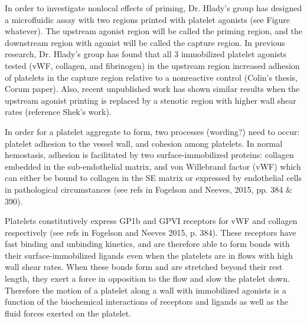 In order to investigate nonlocal effects of priming, Dr. Hlady's group
has designed a microfluidic assay with two regions printed with
platelet agonists (see Figure whatever). The upstream agonist region
will be called the priming region, and the downstream region with
agonist will be called the capture region. In previous research,
Dr. Hlady's group has found that all 3 immobilized platelet agonists
tested (vWF, collagen, and fibrinogen) in the upstream region
increased adhesion of platelets in the capture region relative to a
nonreactive control (Colin's thesis, Corum paper). Also, recent
unpublished work has shown similar results when the upstream agonist
printing is replaced by a stenotic region with higher wall shear rates
(reference Shek's work).
	
In order for a platelet aggregate to form, two processes (wording?)
need to occur: platelet adhesion to the vessel wall, and cohesion
among platelets. In normal hemostasis, adhesion is facilitated by two
surface-immobilized proteins: collagen embedded in the sub-endothelial
matrix, and von Willebrand factor (vWF) which can either be bound to
collagen in the SE matrix or expressed by endothelial cells in
pathological circumstances (see refs in Fogelson and Neeves, 2015,
pp. 384 \& 390).
		
Platelets constitutively express GP1b and GPVI receptors for vWF and
collagen respectively (see refs in Fogelson and Neeves 2015,
p. 384). These receptors have fast binding and unbinding kinetics, and
are therefore able to form bonds with their surface-immobilized
ligands even when the platelets are in flows with high wall shear
rates. When these bonds form and are stretched beyond their rest
length, they exert a force in opposition to the flow and slow the
platelet down. Therefore the motion of a platelet along a wall with
immobilized agonists is a function of the biochemical interactions of
receptors and ligands as well as the fluid forces exerted on the
platelet.
		
